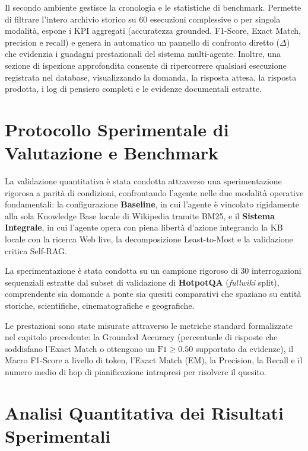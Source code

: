 Il secondo ambiente gestisce la cronologia e le statistiche di benchmark. Permette di filtrare l'intero archivio storico su 60 esecuzioni complessive o per singola modalità, espone i KPI aggregati (accuratezza grounded, F1-Score, Exact Match, precision e recall) e genera in automatico un pannello di confronto diretto ($\Delta$) che evidenzia i guadagni prestazionali del sistema multi-agente. Inoltre, una sezione di ispezione approfondita consente di ripercorrere qualsiasi esecuzione registrata nel database, visualizzando la domanda, la risposta attesa, la risposta prodotta, i log di pensiero completi e le evidenze documentali estratte.

\section{Protocollo Sperimentale di Valutazione e Benchmark}
\label{sec:protocollo_sperimentale}

La validazione quantitativa è stata condotta attraverso una sperimentazione rigorosa a parità di condizioni, confrontando l'agente nelle due modalità operative fondamentali: la configurazione \textbf{Baseline}, in cui l'agente è vincolato rigidamente alla sola Knowledge Base locale di Wikipedia tramite BM25, e il \textbf{Sistema Integrale}, in cui l'agente opera con piena libertà d'azione integrando la KB locale con la ricerca Web live, la decomposizione Least-to-Most e la validazione critica Self-RAG.

La sperimentazione è stata condotta su un campione rigoroso di 30 interrogazioni sequenziali estratte dal subset di validazione di \textbf{HotpotQA} (\textit{fullwiki} split), comprendente sia domande a ponte sia quesiti comparativi che spaziano su entità storiche, scientifiche, cinematografiche e geografiche.

Le prestazioni sono state misurate attraverso le metriche standard formalizzate nel capitolo precedente: la Grounded Accuracy (percentuale di risposte che soddisfano l'Exact Match o ottengono un $\text{F1} \ge 0.50$ supportato da evidenze), il Macro F1-Score a livello di token, l'Exact Match (EM), la Precision, la Recall e il numero medio di hop di pianificazione intrapresi per risolvere il quesito.

\section{Analisi Quantitativa dei Risultati Sperimentali}
\label{sec:risultati_quantitativi}

